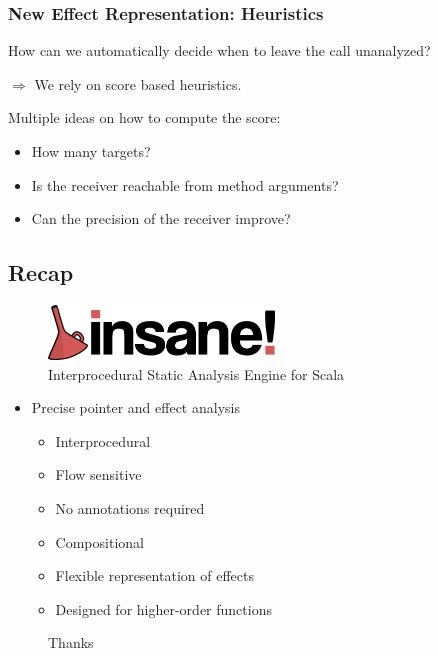 \documentclass[hyperref={pdfpagelabels=false}]{beamer}
\begin{document}
\begin{frame}[fragile]
\frametitle{New Effect Representation: Heuristics}
    How can we automatically decide when to leave the call unanalyzed?

    \vspace{15pt}
    $\Rightarrow$ We rely on score based heuristics.

    \vspace{15pt}
    Multiple ideas on how to compute the score:
    \begin{itemize}
        \item How many targets?
        \item Is the receiver reachable from method arguments?
        \item Can the precision of the receiver improve?
    \end{itemize}
\end{frame}

\subsection{Recap}
\begin{frame}[label=overview]
    \begin{figure}[t]
        \includegraphics[width=60mm]{../../../logo.png}\\
        Interprocedural Static Analysis Engine for Scala
    \end{figure}

    \begin{itemize}
        \item Precise pointer and effect analysis
            \begin{itemize}
                \item Interprocedural
                \item Flow sensitive
                \item No annotations required
                \item Compositional
                \item Flexible representation of effects
                \item Designed for higher-order functions
            \end{itemize}
    \end{itemize}
\end{frame}
\begin{frame}[fragile]
    \begin{figure}
    \begin{center}
    Thanks
    \end{center}
    \end{figure}
\end{frame}
\appendix
{}
\setcounter{finalframe}{\value{framenumber}}
\end{document}
